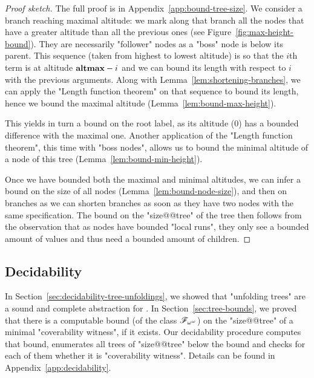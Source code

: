 \begin{proof}[Proof sketch]
	The full proof is in Appendix~\ref{app:bound-tree-size}.
	We consider a branch reaching maximal altitude: we mark along that branch all the nodes that have a greater altitude than all the previous ones (see Figure~\ref{fig:max-height-bound}). They are necessarily "follower" nodes as a "boss" node is below its parent. This sequence (taken from highest to lowest altitude) is so that the $i$th term is at altitude $\mathbf{altmax}-i$ and we can bound its length with respect to $i$ with the previous arguments. Along with Lemma~\ref{lem:shortening-branches}, we can apply the "Length function theorem" on that sequence to bound its length, hence we bound the maximal altitude (Lemma~\ref{lem:bound-max-height}).
	
	This yields in turn a bound on the root label, as its altitude ($0$) has a bounded difference with the maximal one. Another application of the "Length function theorem", this time with "boss nodes", allows us to bound the minimal altitude of a node of this tree (Lemma~\ref{lem:bound-min-height}).
	
	Once we have bounded both the maximal and minimal altitudes, we can infer a bound on the size of all nodes (Lemma~\ref{lem:bound-node-size}), and then on branches as we can shorten branches as soon as they have two nodes with the same specification.
	The bound on the "size@@tree" of the tree then follows from the observation that as nodes have bounded "local runs", they only see a bounded amount of values and thus need a bounded amount of children.
\end{proof}


\subsection{Decidability}
\label{sec:decidability-end}

In Section~\ref{sec:decidability-tree-unfoldings}, we showed that "unfolding trees" are a sound and complete abstraction for \COVER. In Section~\ref{sec:tree-bounds}, we proved that there is a computable bound (of the class $\mathscr{F}_{\omega^\omega}$) on the "size@@tree" of a minimal "coverability witness", if it exists. Our decidability procedure computes that bound, enumerates all trees of "size@@tree" below the bound and checks for each of them whether it is "coverability witness". Details can be found in Appendix~\ref{app:decidability}.

\decidablecover*


